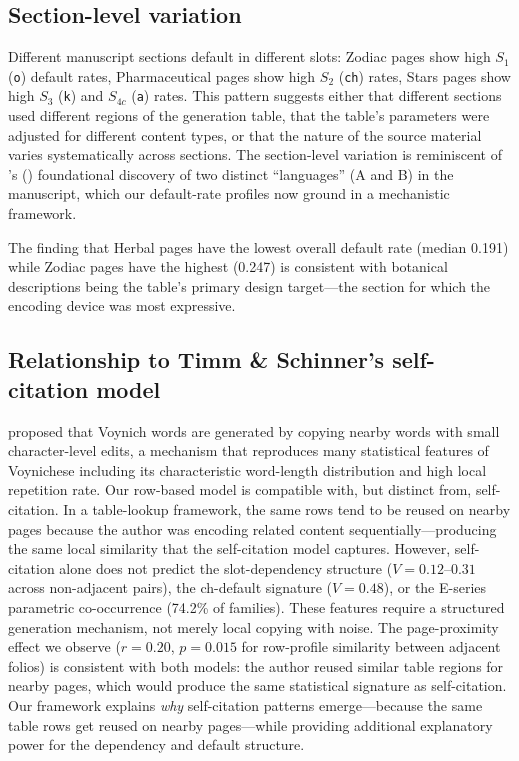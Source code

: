 \documentclass[12pt]{article}
\begin{document}
\subsection{Section-level variation}

Different manuscript sections default in different slots: Zodiac pages show high $S_1$ (\texttt{o}) default rates, Pharmaceutical pages show high $S_2$ (\texttt{ch}) rates, Stars pages show high $S_3$ (\texttt{k}) and $S_{4c}$ (\texttt{a}) rates. This pattern suggests either that different sections used different regions of the generation table, that the table's parameters were adjusted for different content types, or that the nature of the source material varies systematically across sections. The section-level variation is reminiscent of \citeauthor{Currier1976}'s (\citeyear{Currier1976}) foundational discovery of two distinct ``languages'' (A and B) in the manuscript, which our default-rate profiles now ground in a mechanistic framework.

The finding that Herbal pages have the lowest overall default rate (median 0.191) while Zodiac pages have the highest (0.247) is consistent with botanical descriptions being the table's primary design target---the section for which the encoding device was most expressive.

\subsection{Relationship to Timm \& Schinner's self-citation model}

\citet{Timm2020} proposed that Voynich words are generated by copying nearby words with small character-level edits, a mechanism that reproduces many statistical features of Voynichese including its characteristic word-length distribution and high local repetition rate. Our row-based model is compatible with, but distinct from, self-citation. In a table-lookup framework, the same rows tend to be reused on nearby pages because the author was encoding related content sequentially---producing the same local similarity that the self-citation model captures. However, self-citation alone does not predict the slot-dependency structure ($V = 0.12$--$0.31$ across non-adjacent pairs), the ch-default signature ($V = 0.48$), or the E-series parametric co-occurrence (74.2\% of families). These features require a structured generation mechanism, not merely local copying with noise. The page-proximity effect we observe ($r = 0.20$, $p = 0.015$ for row-profile similarity between adjacent folios) is consistent with both models: the author reused similar table regions for nearby pages, which would produce the same statistical signature as self-citation. Our framework explains \emph{why} self-citation patterns emerge---because the same table rows get reused on nearby pages---while providing additional explanatory power for the dependency and default structure.
\end{document}

